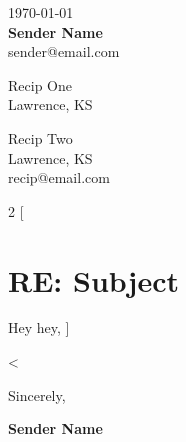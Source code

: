 \documentclass[11pt, letterpaper]{article}
\begin{document}
\begin{flushright}

\today\\
\vspace{.5cm}
\textbf{Sender Name}\\
sender@email.com\\

\end{flushright}

\noindent
Recip One\\
Lawrence, KS

\bigskip\bigskip
\noindent
Recip Two\\
Lawrence, KS\\
recip@email.com

\bigskip\bigskip
\begin{multicols}{2}
[
	\section*{RE: Subject}
	\bigskip
	Hey hey,
]

<%

\end{multicols}

\bigskip\bigskip
Sincerely,

\bigskip\bigskip
\textbf{Sender Name}
\end{document}
